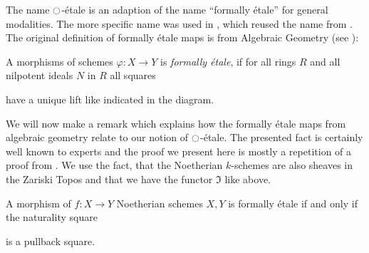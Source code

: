 \documentclass[9pt,twosided]{amsart}
\begin{document}
The name ${\ocircle}$-étale is an adaption of the name ``formally étale'' for general modalities.
The more specific name was used in \cite{wellen-thesis}, which reused the name from \cite{SyntheticPDEs}.
The original definition of formally étale maps is from Algebraic Geometry (see \cite[§ 17]{GrothendieckDieudonne}):
\begin{defn}
  A morphisms of schemes $\varphi:X\to Y$ is \emph{formally étale},
  if for all rings $R$ and all nilpotent ideals $N$ in $R$ all squares
  \begin{center}
  \end{center}
  have a unique lift like indicated in the diagram.
\end{defn}
We will now make a remark which explains how the formally étale maps from algebraic geometry relate to our notion of ${\ocircle}$-étale.
The presented fact is certainly well known to experts and the proof we present here is mostly a repetition of a proof from \cite[Section 4.4]{wellen-thesis}.
We use the fact, that the Noetherian $k$-schemes are also sheaves in the Zariski Topos and that we have the functor $\Im$ like above.
\begin{rmk}
  A morphism of $f:X\to Y$ Noetherian schemes $X,Y$ is formally étale if and only if the naturality square
  \begin{center}
  \end{center}
  is a pullback square.
\end{rmk}
\end{document}
